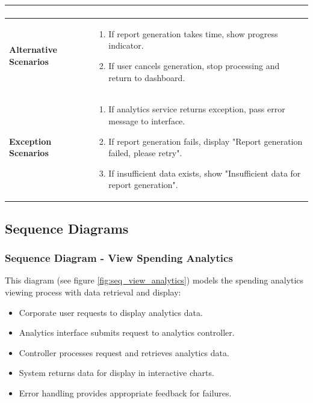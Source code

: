 \begin{longtable}{|p{}|p{}|}
\begin{enumerate}[nosep,leftmargin=*]
    \end{enumerate} \\ \hline
  \textbf{Alternative Scenarios} &
    \begin{enumerate}[nosep,leftmargin=*]
      \item If report generation takes time, show progress indicator.
      \item If user cancels generation, stop processing and return to dashboard.
    \end{enumerate} \\ \hline
  \textbf{Exception Scenarios} &
    \begin{enumerate}[nosep,leftmargin=*]
      \item If analytics service returns exception, pass error message to interface.
      \item If report generation fails, display "Report generation failed, please retry".
      \item If insufficient data exists, show "Insufficient data for report generation".
    \end{enumerate} \\ \hline

\end{longtable}

\subsection{Sequence Diagrams}

\subsubsection{Sequence Diagram - View Spending Analytics}
This diagram (see figure \ref{fig:seq_view_analytics}) models the spending analytics viewing process with data retrieval and display:
\begin{itemize}[nosep,leftmargin=*]
  \item Corporate user requests to display analytics data.
  \item Analytics interface submits request to analytics controller.
  \item Controller processes request and retrieves analytics data.
  \item System returns data for display in interactive charts.
  \item Error handling provides appropriate feedback for failures.
\end{itemize}

